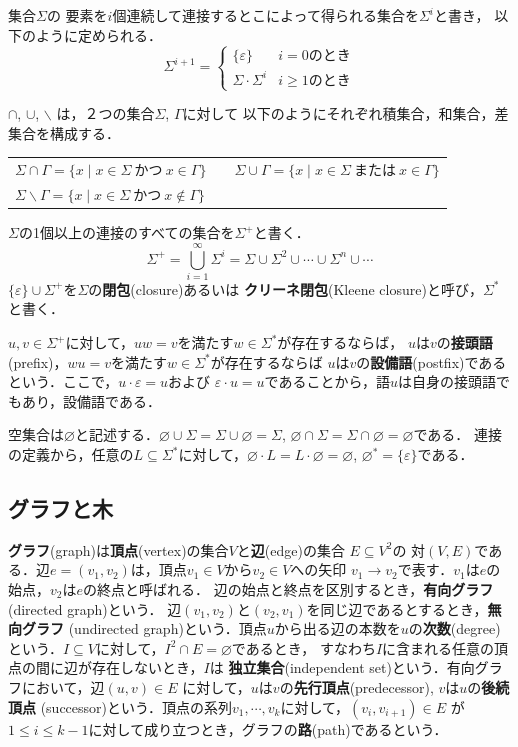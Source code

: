 \documentclass[a4j,dvipdfmx]{jbook}
\begin{document}
集合$\Sigma$の
要素を$i$個連続して連接するとこによって得られる集合を$\Sigma^i$と書き，
以下のように定められる．
\[\Sigma^{i+1}=\begin{cases}\{\varepsilon\} & \mbox{$i=0$のとき}\\
  \Sigma\cdot\Sigma^i & \mbox{$i\geq 1$のとき}\end{cases}\]

$\cap$, $\cup$, $\backslash$ は，２つの集合$\Sigma$, $\Gamma$に対して
以下のようにそれぞれ積集合，和集合，差集合を構成する．

\begin{center}
  \begin{tabular}{lcl}
  $\Sigma\cap\Gamma=\{x\;|\;x\in\Sigma\ \mbox{かつ}\ x\in\Gamma\}$
  & &
  $\Sigma\cup\Gamma=\{x\;|\;x\in\Sigma\ \mbox{または}\ x\in\Gamma\}$\\
  $\Sigma\backslash\Gamma=\{x\;|\;x\in\Sigma\ \mbox{かつ}\ x\notin\Gamma\}$
  \end{tabular}
\end{center}

$\Sigma$の1個以上の連接のすべての集合を$\Sigma^+$と書く．
\[\Sigma^+=\bigcup_{i=1}^\infty\Sigma^i=\Sigma\cup\Sigma^2\cup\cdots\cup\Sigma^n\cup\cdots\]
$\{\varepsilon\}\cup\Sigma^+$を$\Sigma$の{\bf 閉包}(closure)あるいは
{\bf クリーネ閉包}(Kleene closure)と呼び，$\Sigma^\ast$と書く．

$u,v\in\Sigma^+$に対して，$uw=v$を満たす$w\in\Sigma^\ast$が存在するならば，
$u$は$v$の{\bf 接頭語}(prefix)，$wu=v$を満たす$w\in\Sigma^\ast$が存在するならば
$u$は$v$の{\bf 設備語}(postfix)であるという．ここで，$u\cdot\varepsilon=u$および
$\varepsilon\cdot u=u$であることから，語$u$は自身の接頭語でもあり，設備語である．

空集合は$\varnothing$と記述する．$\varnothing\cup\Sigma=\Sigma\cup\varnothing=\Sigma$,
$\varnothing\cap\Sigma=\Sigma\cap\varnothing=\varnothing$である．
連接の定義から，任意の$L\subseteq\Sigma^\ast$に対して，$\varnothing\cdot L=
L\cdot\varnothing=\varnothing$, $\varnothing^\ast=\{\varepsilon\}$である．

\subsection{グラフと木}

{\bf グラフ}(graph)は{\bf 頂点}(vertex)の集合$V$と{\bf 辺}(edge)の集合
$E\subseteq V^2$の
対$(V,E)$である．辺$e=(v_1,v_2)$は，頂点$v_1\in V$から$v_2\in V$への矢印
$v_1\rightarrow v_2$で表す．$v_1$は$e$の始点，$v_2$は$e$の終点と呼ばれる．
辺の始点と終点を区別するとき，{\bf 有向グラフ}(directed graph)という．
辺$(v_1,v_2)$と$(v_2,v_1)$を同じ辺であるとするとき，{\bf 無向グラフ}
(undirected graph)という．頂点$u$から出る辺の本数を$u$の{\bf 次数}(degree)
という．$I\subseteq V$に対して，$I^2\cap E=\varnothing$であるとき，
すなわち$I$に含まれる任意の頂点の間に辺が存在しないとき，$I$は
{\bf 独立集合}(independent set)という．有向グラフにおいて，辺$(u,v)\in E$
に対して，$u$は$v$の{\bf 先行頂点}(predecessor), $v$は$u$の{\bf 後続頂点}
(successor)という．頂点の系列$v_1,\cdots,v_k$に対して，$(v_i,v_{i+1})\in E$
が$1\leq i\leq k-1$に対して成り立つとき，グラフの{\bf 路}(path)であるという．
\end{document}
